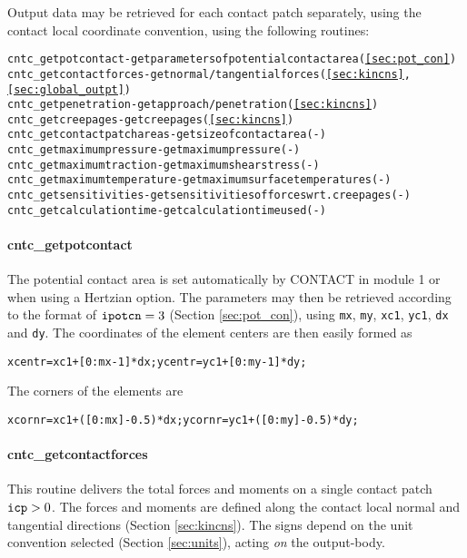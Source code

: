 \documentclass[12pt]{report}
\begin{document}
Output data may be retrieved for each contact patch separately, using the
contact local coordinate convention, using the following routines:
\begin{alltt}\small
cntc_getpotcontact         - get parameters of potential contact area (\ref{sec:pot_con})
cntc_getcontactforces      - get normal/tangential forces (\ref{sec:kincns}, \ref{sec:global_outpt})
cntc_getpenetration        - get approach/penetration (\ref{sec:kincns})
cntc_getcreepages          - get creepages (\ref{sec:kincns})
cntc_getcontactpatchareas  - get size of contact area (-)
cntc_getmaximumpressure    - get maximum pressure (-)
cntc_getmaximumtraction    - get maximum shear stress (-)
cntc_getmaximumtemperature - get maximum surface temperatures (-)
cntc_getsensitivities      - get sensitivities of forces wrt. creepages (-)
cntc_getcalculationtime    - get calculation time used (-)
\end{alltt}

\paragraph{cntc\_getpotcontact}

The potential contact area is set automatically by CONTACT in module 1 or
when using a Hertzian option. The parameters may then be retrieved
according to the format of ${\tt ipotcn}=3$ (Section \ref{sec:pot_con}),
using {\tt mx}, {\tt my}, {\tt xc1}, {\tt yc1}, {\tt dx} and {\tt dy}. The
coordinates of the element centers are then easily formed as
\begin{alltt}\small
  xcentr = xc1 +  [0:mx-1] * dx;     ycentr = yc1 +  [0:my-1] * dy;
\end{alltt}
The corners of the elements are
\begin{alltt}\small
  xcornr = xc1 + ([0:mx]-0.5) * dx;  ycornr = yc1 + ([0:my]-0.5) * dy;
\end{alltt}

\paragraph{cntc\_getcontactforces}

This routine delivers the total forces and moments on a single contact
patch ${\tt icp}>0$. The forces and moments are defined along the contact
local normal and tangential directions (Section \ref{sec:kincns}).
The signs depend on the unit convention selected (Section \ref{sec:units}),
acting {\em on\/} the output-body.
\end{document}
